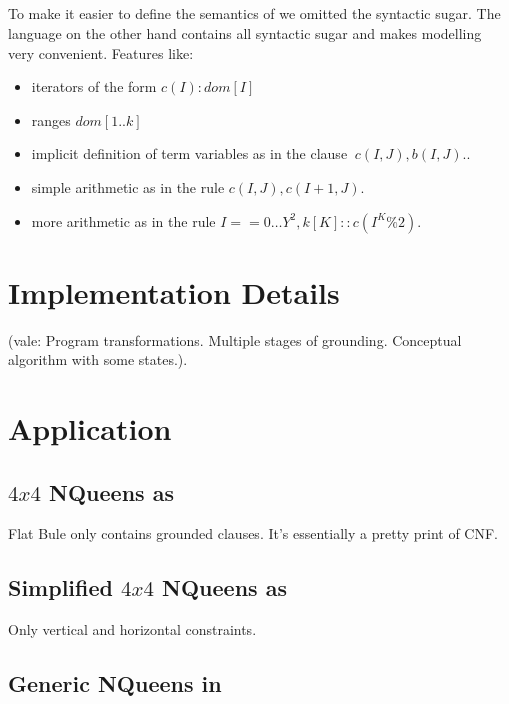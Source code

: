 \documentclass[conference]{IEEEtran}
\newcommand{\vale}[1]{\textcolor[rgb]{1.00,0.00,0.0}{(vale: #1). } }
\begin{document}
\subsection{\bnice}

To make it easier to define the semantics of \bfull we omitted the syntactic sugar. 
The language \bnice on the other hand contains all syntactic sugar and makes modelling very convenient.  
Features like: 

\begin{itemize}
  \item iterators of the form $c(I):dom[I]$
  \item ranges $dom[1..k]$ 
  \item implicit definition of term variables as in the clause $~c(I,J),b(I,J).$.
  \item simple arithmetic as in the rule $c(I,J),c(I+1,J).$ 
  \item more arithmetic as in the rule $ I== 0 \ldots Y^2, k[K] :: c(I^K\%2).$
\end{itemize}

\section{Implementation Details}

\vale{Program transformations. Multiple stages of grounding. Conceptual algorithm with some states.}

\section{Application}

\subsection{$4x4$ NQueens as \bflat}

Flat Bule only contains grounded clauses. It's essentially a pretty print of CNF.



\subsection{Simplified $4x4$ NQueens as \bcore}

Only vertical and horizontal constraints.



\subsection{Generic NQueens in \bfull}
\end{document}
